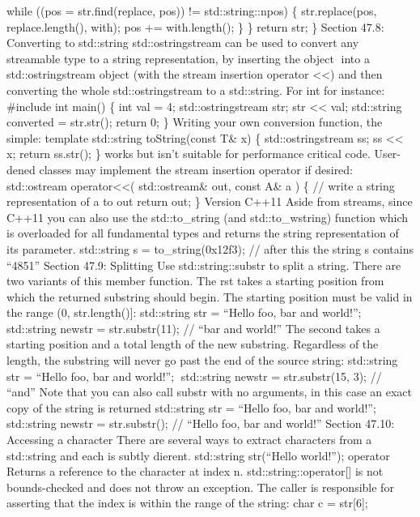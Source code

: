 while ((pos = str.find(replace, pos)) != std::string::npos) \{
str.replace(pos, replace.length(), with); pos += with.length(); \} \}
return str; \} Section 47.8: Converting to std::string
std::ostringstream can be used to convert any streamable type to a
string representation, by inserting the object into a
std::ostringstream object (with the stream insertion operator
\textless\textless) and then converting the whole std::ostringstream to
a std::string. For int for instance: \#include int main() \{ int val =
4; std::ostringstream str; str \textless\textless{} val; std::string
converted = str.str(); return 0; \} Writing your own conversion
function, the simple: template std::string toString(const T\& x) \{
std::ostringstream ss; ss \textless\textless{} x; return ss.str(); \}
works but isn't suitable for performance critical code. User-dened
classes may implement the stream insertion operator if desired:
std::ostream operator\textless\textless( std::ostream\& out, const A\& a
) \{ // write a string representation of a to out return out; \} Version
C++11 Aside from streams, since C++11 you can also use the
std::to\_string (and std::to\_wstring) function which is overloaded for
all fundamental types and returns the string representation of its
parameter. std::string s = to\_string(0x12f3); // after this the string
s contains ``4851'' Section 47.9: Splitting Use std::string::substr to
split a string. There are two variants of this member function. The rst
takes a starting position from which the returned substring should
begin. The starting position must be valid in the range (0,
str.length(){]}: std::string str = ``Hello foo, bar and world!'';
std::string newstr = str.substr(11); // ``bar and world!'' The second
takes a starting position and a total length of the new substring.
Regardless of the length, the substring will never go past the end of
the source string: std::string str = ``Hello foo, bar and world!'';
std::string newstr = str.substr(15, 3); // ``and'' Note that you can
also call substr with no arguments, in this case an exact copy of the
string is returned std::string str = ``Hello foo, bar and world!'';
std::string newstr = str.substr(); // ``Hello foo, bar and world!''
Section 47.10: Accessing a character There are several ways to extract
characters from a std::string and each is subtly dierent. std::string
str(``Hello world!''); operator\href{n}{} Returns a reference to the
character at index n. std::string::operator{[}{]} is not bounds-checked
and does not throw an exception. The caller is responsible for asserting
that the index is within the range of the string: char c = str{[}6{]};
